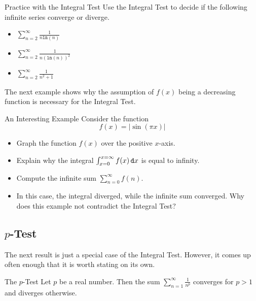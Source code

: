 \begin{exercise}{Practice with the Integral Test \Coffeecup \Coffeecup }
Use the Integral Test to decide if the following infinite series converge or diverge.
\begin{itemize}
\item $\sum_{n=2}^\infty \frac{1}{n\mathtt{ln}(n)}$
\vspace*{1in}
\item  $\sum_{n=2}^\infty \frac{1}{n(\mathtt{ln}(n))^2}$
\vspace*{1in}
\item  $\sum_{n=2}^\infty \frac{1}{n^2+1}$
\vspace*{1in}
\end{itemize}
\end{exercise}

The next example shows why the assumption of $f(x)$ being a decreasing function is necessary for the Integral Test.  

\begin{exercise}{An Interesting Example \Coffeecup \Coffeecup \Coffeecup}
Consider the function $$f(x)=\left|\sin(\pi x)\right| $$
\begin{itemize}
\item Graph the function $f(x)$ over the positive $x$-axis.
\vspace*{1in}
\item Explain why the integral $\int_{x=0}^{x=\infty} f(x)\mathop{}\!\mathtt{d} x$ is equal to infinity.
\vspace*{1in}
\item Compute the infinite sum $ \sum_{n=0}^\infty f(n)$.
\vspace*{1in}
\item In this case, the integral diverged, while the infinite sum converged.  Why does this example not contradict the Integral Test?
\vspace*{.5in}
\end{itemize}
\end{exercise}

\subsection{$p$-Test}
The next result is just a special case of the Integral Test.  However, it comes up often enough that it is worth stating on its own.

\begin{theorem}{The $p$-Test }
Let $p$ be a real number.  Then the sum $\sum_{n=1}^\infty \frac{1}{n^p}$ converges for $p>1$ and diverges otherwise. 
\end{theorem}

